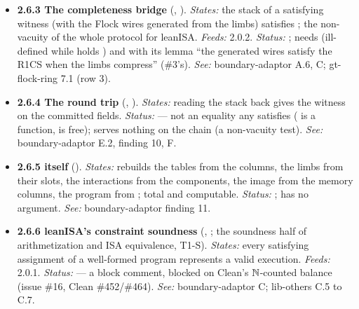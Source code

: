 \begin{itemize}[label={}, leftmargin=1.3em, itemindent=-1.3em, labelwidth=0pt, labelsep=0pt, itemsep=4pt, topsep=3pt]
\begin{itemize}[label={}, leftmargin=1.3em, itemindent=-1.3em, labelwidth=0pt, labelsep=0pt, itemsep=4pt, topsep=3pt]
\item {}\label{obl:node-2.6.2.7}\textbf{2.6.2.7 The three fixed-column facts and decodability} (from the instance's  columns and the type of ). \emph{Status:} ; ``statement binding'' needs the injectivity of , unstated. \emph{See:} boundary-adaptor B.2, F.
\end{itemize}
\item {}\label{obl:node-2.6.3}\textbf{2.6.3 The completeness bridge} (, ). \emph{States:} the stack of a satisfying witness (with the Flock wires generated from the limbs) satisfies ; the non-vacuity of the whole protocol for leanISA. \emph{Feeds:} 2.0.2. \emph{Status:} ; needs  (ill-defined while  holds ) and  with its lemma ``the generated wires satisfy the R1CS when the limbs compress''  (\#3's). \emph{See:} boundary-adaptor A.6, C; gt-flock-ring 7.1 (row 3).
\item {}\label{obl:node-2.6.4}\textbf{2.6.4 The round trip} (, ). \emph{States:} reading the stack back gives the witness on the committed fields. \emph{Status:}  — not an equality any  satisfies ( is a function,  is free); serves nothing on the chain (a non-vacuity test). \emph{See:} boundary-adaptor E.2, finding 10, F.
\item {}\label{obl:node-2.6.5}\textbf{2.6.5  itself} (). \emph{States:} rebuilds the tables from the columns, the limbs from their slots, the interactions from the components, the image from the memory columns, the program from ; total and computable. \emph{Status:} ; has no  argument. \emph{See:} boundary-adaptor finding 11.
\item {}\label{obl:node-2.6.6}\textbf{2.6.6 leanISA's constraint soundness} (, ; the soundness half of arithmetization and ISA equivalence, T1-S). \emph{States:} every satisfying assignment of a well-formed program represents a valid execution. \emph{Feeds:} 2.0.1. \emph{Status:}  — a block comment, blocked on Clean's \ensuremath{\N}-counted balance (issue \#16, Clean \#452/\#464). \emph{See:} boundary-adaptor C; lib-others C.5 to C.7.

\end{itemize}
